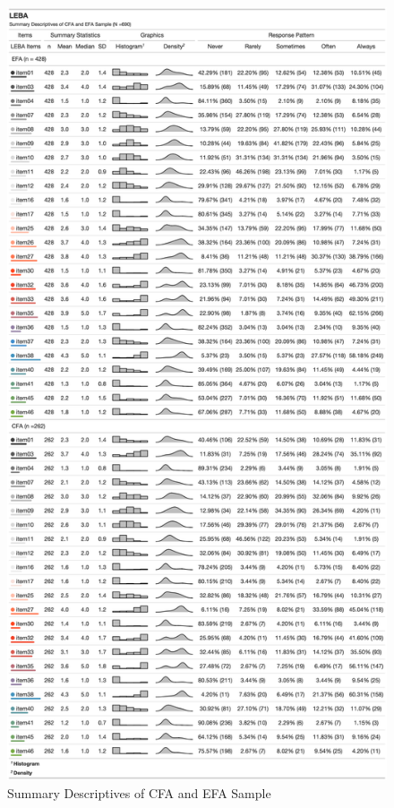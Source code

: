 \documentclass[
  english,
  man]{apa6}
\begin{document}
\begin{figure}
\includegraphics[width=2\linewidth,height=1\textheight]{Manuscript.figures/gt} \caption{ Summary Descriptives of CFA and EFA Sample}\label{fig:gtPic}
\end{figure}
\end{document}
